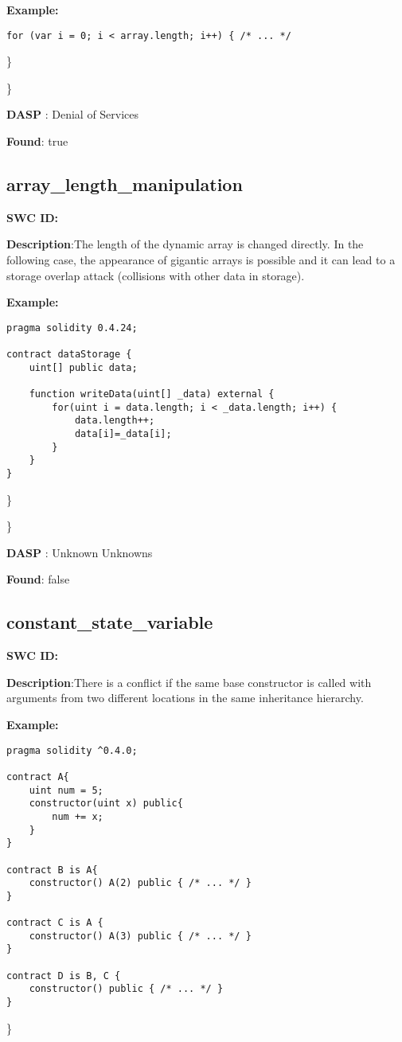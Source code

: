 \documentclass{article}
\begin{document}
\textbf{Example:} 
\begin{verbatim}
for (var i = 0; i < array.length; i++) { /* ... */

\end{verbatim}\} 

\} 

\textbf{DASP} : Denial of Services

\textbf{Found}: true

\subsection{array\_length\_manipulation} 
\textbf{SWC \textunderscore ID:} 

\textbf{Description}:The length of the dynamic array is changed directly. In the following case, the appearance of gigantic arrays is possible and it can lead to a storage overlap attack (collisions with other data in storage).


\textbf{Example:} 
\begin{verbatim}
pragma solidity 0.4.24;

contract dataStorage {
    uint[] public data;

    function writeData(uint[] _data) external {
        for(uint i = data.length; i < _data.length; i++) {
            data.length++;
            data[i]=_data[i];
        }
    }
}

\end{verbatim}\} 

\} 

\textbf{DASP} : Unknown Unknowns

\textbf{Found}: false

\subsection{constant\_state\_variable} 
\textbf{SWC \textunderscore ID:} 

\textbf{Description}:There is a conflict if the same base constructor is called with arguments from two different locations in the same inheritance hierarchy.


\textbf{Example:} 
\begin{verbatim}
pragma solidity ^0.4.0;

contract A{
    uint num = 5;
    constructor(uint x) public{
        num += x;
    }
}

contract B is A{
    constructor() A(2) public { /* ... */ }
}

contract C is A {
    constructor() A(3) public { /* ... */ }
}

contract D is B, C {
    constructor() public { /* ... */ }
}

\end{verbatim}\} 
\end{document}
